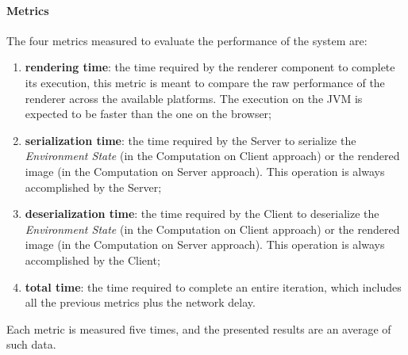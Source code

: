 \paragraph{Metrics}
The four metrics measured to evaluate the performance of the system are:
\begin{enumerate}
	\item \textbf{rendering time}: the time required by the renderer component to complete its execution, this
	metric is meant to compare the raw performance of the renderer across the available platforms. The execution on the JVM is expected to be faster than the one on the browser;
	\item \textbf{serialization time}: the time required by the Server to serialize the \textit{Environment State} (in the Computation on Client approach) or the rendered image (in the Computation on Server approach). This operation is always accomplished by the Server;
	\item \textbf{deserialization time}: the time required by the Client to deserialize the \textit{Environment State} (in the Computation on Client approach) or the rendered image (in the Computation on Server approach). This operation is always accomplished by the Client;
	\item \textbf{total time}: the time required to complete an entire iteration, which includes all the previous metrics plus the network delay.
\end{enumerate}

Each metric is measured five times, and the presented results are an average of such data.

